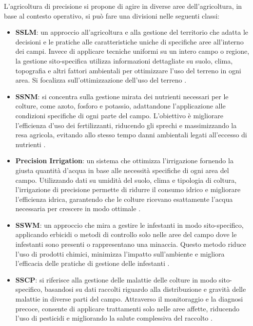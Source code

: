 \documentclass[12pt,a4paper,openright,twoside, openany]{book}
\begin{document}
L'agricoltura di precisione si propone di agire in diverse aree dell'agricoltura, in base al contesto operativo, si può fare una divisioni nelle seguenti classi:
\begin{itemize}[noitemsep]
    \item \textbf{\ac{SSLM}}: un approccio all'agricoltura e alla gestione del territorio che adatta le decisioni e le pratiche alle caratteristiche uniche di specifiche aree all'interno dei campi. Invece di applicare tecniche uniformi su un intero campo o regione, la gestione sito-specifica utilizza informazioni dettagliate su suolo, clima, topografia e altri fattori ambientali per ottimizzare l'uso del terreno in ogni area. Si focalizza sull'ottimizzazione dell'uso del terreno \cite{SSLM}.
    \newpage
    \item \textbf{\ac{SSNM}}: si concentra sulla gestione mirata dei nutrienti necessari per le colture, come azoto, fosforo e potassio, adattandone l'applicazione alle condizioni specifiche di ogni parte del campo. L'obiettivo è migliorare l'efficienza d'uso dei fertilizzanti, riducendo gli sprechi e massimizzando la resa agricola, evitando allo stesso tempo danni ambientali legati all'eccesso di nutrienti \cite{SSNM}.
    \item \textbf{Precision Irrigation}: un sistema che ottimizza l'irrigazione fornendo la giusta quantità d'acqua in base alle necessità specifiche di ogni area del campo. Utilizzando dati su umidità del suolo, clima e tipologia di coltura, l'irrigazione di precisione permette di ridurre il consumo idrico e migliorare l'efficienza idrica, garantendo che le colture ricevano esattamente l'acqua necessaria per crescere in modo ottimale \cite{ANJUM202385}.
    \item \textbf{\ac{SSWM}}: un approccio che mira a gestire le infestanti in modo sito-specifico, applicando erbicidi o metodi di controllo solo nelle aree del campo dove le infestanti sono presenti o rappresentano una minaccia. Questo metodo riduce l'uso di prodotti chimici, minimizza l'impatto sull'ambiente e migliora l'efficacia delle pratiche di gestione delle infestanti \cite{SSWM}.
    \item \textbf{\ac{SSCP}}: si riferisce alla gestione delle malattie delle colture in modo sito-specifico, basandosi su dati raccolti riguardo alla distribuzione e gravità delle malattie in diverse parti del campo. Attraverso il monitoraggio e la diagnosi precoce, consente di applicare trattamenti solo nelle aree affette, riducendo l'uso di pesticidi e migliorando la salute complessiva del raccolto \cite{SSCP}.
\end{itemize}
\newpage
\end{document}
